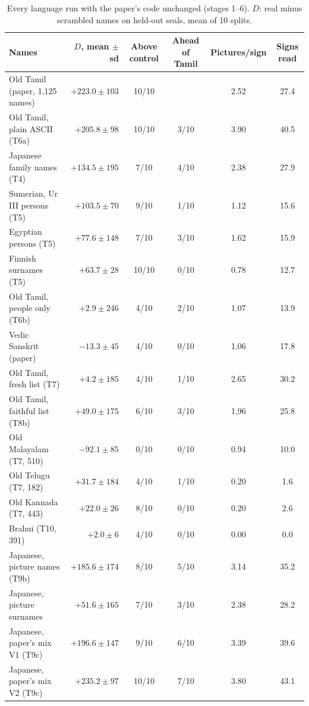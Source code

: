 \documentclass[11pt,a4paper]{article}
\begin{document}
\begin{table}[t]
\centering\small
\caption{Every language run with the paper's code unchanged (stages 1--6). $D$: real minus scrambled names on held-out seals, mean of 10 splits.}
\label{tab:panel}
\setlength{\tabcolsep}{4pt}
\begin{tabular}{lrcccc}
\toprule
Names & $D$, mean $\pm$ sd & Above control & Ahead of Tamil & Pictures/sign & Signs read\\
\midrule
Old Tamil (paper, 1,125 names) & $+223.0\pm103$ & 10/10 & & 2.52 & 27.4\\
Old Tamil, plain ASCII (T6a) & $+205.8\pm98$ & 10/10 & 3/10 & 3.90 & 40.5\\
Japanese family names (T4) & $+134.5\pm195$ & 7/10 & 4/10 & 2.38 & 27.9\\
Sumerian, Ur III persons (T5) & $+103.5\pm70$ & 9/10 & 1/10 & 1.12 & 15.6\\
Egyptian persons (T5) & $+77.6\pm148$ & 7/10 & 3/10 & 1.62 & 15.9\\
Finnish surnames (T5) & $+63.7\pm28$ & 10/10 & 0/10 & 0.78 & 12.7\\
Old Tamil, people only (T6b) & $+2.9\pm246$ & 4/10 & 2/10 & 1.07 & 13.9\\
Vedic Sanskrit (paper) & $-13.3\pm45$ & 4/10 & 0/10 & 1.06 & 17.8\\
\midrule
Old Tamil, fresh list (T7) & $+4.2\pm185$ & 4/10 & 1/10 & 2.65 & 30.2\\
Old Tamil, faithful list (T8b) & $+49.0\pm175$ & 6/10 & 3/10 & 1.96 & 25.8\\
Old Malayalam (T7, 510) & $-92.1\pm85$ & 0/10 & 0/10 & 0.94 & 10.0\\
Old Telugu (T7, 182) & $+31.7\pm184$ & 4/10 & 1/10 & 0.20 & 1.6\\
Old Kannada (T7, 443) & $+22.0\pm26$ & 8/10 & 0/10 & 0.20 & 2.6\\
Brahui (T10, 391) & $+2.0\pm6$ & 4/10 & 0/10 & 0.00 & 0.0\\
\midrule
Japanese, picture names (T9b) & $+185.6\pm174$ & 8/10 & 5/10 & 3.14 & 35.2\\
Japanese, picture surnames & $+51.6\pm165$ & 7/10 & 3/10 & 2.38 & 28.2\\
Japanese, paper's mix V1 (T9c) & $+196.6\pm147$ & 9/10 & 6/10 & 3.39 & 39.6\\
Japanese, paper's mix V2 (T9c) & $+235.2\pm97$ & 10/10 & 7/10 & 3.80 & 43.1\\
\bottomrule
\end{tabular}
\end{table}
\end{document}

